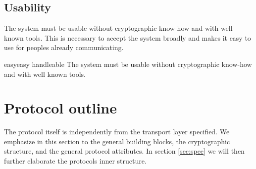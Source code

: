 \subsection{Usability}
The system must be usable without cryptographic know-how and with well known tools. This is necessary to accept the system broadly and makes it easy to use for peoples already communicating.

\begin{requirement}{easy}{easy handleable}
	The system must be usable without cryptographic know-how and with well known tools.
\end{requirement}

\section{Protocol outline}
The protocol itself is independently from the transport layer specified. We emphasize in this section to the general building blocks, the cryptographic structure, and the general protocol attributes. In section \ref{sec:spec} we will then further elaborate the protocols inner structure.

